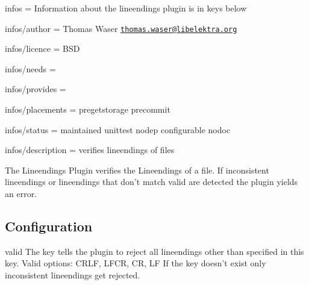
\begin{DoxyItemize}
\item infos = Information about the lineendings plugin is in keys below
\item infos/author = Thomas Waser \href{mailto:thomas.waser@libelektra.org}{\tt thomas.\+waser@libelektra.\+org}
\item infos/licence = B\+S\+D
\item infos/needs =
\item infos/provides =
\item infos/placements = pregetstorage precommit
\item infos/status = maintained unittest nodep configurable nodoc
\item infos/description = verifies lineendings of files
\end{DoxyItemize}

The Lineendings Plugin verifies the Lineendings of a file. If inconsistent lineendings or lineendings that don't match {\ttfamily valid} are detected the plugin yields an error.

\subsection*{Configuration}

{\ttfamily valid} The key tells the plugin to reject all lineendings other than specified in this key. Valid options\+: C\+R\+L\+F, L\+F\+C\+R, C\+R, L\+F If the key doesn't exist only inconsistent lineendings get rejected. 